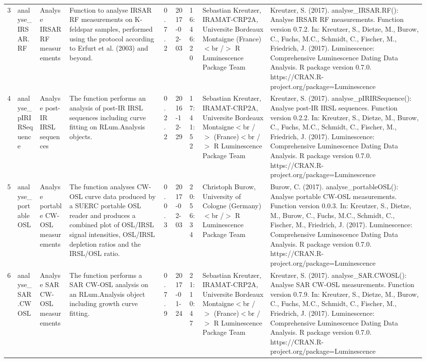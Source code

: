 \begin{table}[ht]
\begin{tabular}{rllllllll}
 \\ 
  3 & analyse\_IRSAR.RF & Analyse IRSAR RF measurements & Function to analyse IRSAR RF measurements on K-feldspar samples, performed using the protocol according to Erfurt et al. (2003) and beyond. & 0.7.2 & 2017-02-03 & 16:46:20
 & Sebastian Kreutzer, IRAMAT-CRP2A, Universite Bordeaux Montaigne (France)$<$br /$>$  R Luminescence Package Team & Kreutzer, S. (2017). analyse\_IRSAR.RF(): Analyse IRSAR RF measurements. Function version 0.7.2. In: Kreutzer, S., Dietze, M., Burow, C., Fuchs, M.C., Schmidt, C., Fischer, M., Friedrich, J. (2017). Luminescence: Comprehensive Luminescence Dating Data Analysis. R package version 0.7.0. https://CRAN.R-project.org/package=Luminescence
 \\ 
  4 & analyse\_pIRIRSequence & Analyse post-IR IRSL sequences & The function performs an analysis of post-IR IRSL sequences including curve fitting on  RLum.Analysis  objects. & 0.2.2 & 2016-12-29 & 17:41:52
 & Sebastian Kreutzer, IRAMAT-CRP2A, Universite Bordeaux Montaigne$<$br /$>$ (France)$<$br /$>$  R Luminescence Package Team & Kreutzer, S. (2017). analyse\_pIRIRSequence(): Analyse post-IR IRSL sequences. Function version 0.2.2. In: Kreutzer, S., Dietze, M., Burow, C., Fuchs, M.C., Schmidt, C., Fischer, M., Friedrich, J. (2017). Luminescence: Comprehensive Luminescence Dating Data Analysis. R package version 0.7.0. https://CRAN.R-project.org/package=Luminescence
 \\ 
  5 & analyse\_portableOSL & Analyse portable CW-OSL measurements & The function analyses CW-OSL curve data produced by a SUERC portable OSL reader and produces a combined plot of OSL/IRSL signal intensities, OSL/IRSL depletion ratios and the IRSL/OSL ratio. & 0.0.3 & 2017-02-03 & 20:56:34
 & Christoph Burow, University of Cologne (Germany)$<$br /$>$  R Luminescence Package Team & Burow, C. (2017). analyse\_portableOSL(): Analyse portable CW-OSL measurements. Function version 0.0.3. In: Kreutzer, S., Dietze, M., Burow, C., Fuchs, M.C., Schmidt, C., Fischer, M., Friedrich, J. (2017). Luminescence: Comprehensive Luminescence Dating Data Analysis. R package version 0.7.0. https://CRAN.R-project.org/package=Luminescence
 \\ 
  6 & analyse\_SAR.CWOSL & Analyse SAR CW-OSL measurements & The function performs a SAR CW-OSL analysis on an RLum.Analysis  object including growth curve fitting. & 0.7.9 & 2017-01-24 & 21:10:47
 & Sebastian Kreutzer, IRAMAT-CRP2A, Universite Bordeaux Montaigne$<$br /$>$ (France)$<$br /$>$  R Luminescence Package Team & Kreutzer, S. (2017). analyse\_SAR.CWOSL(): Analyse SAR CW-OSL measurements. Function version 0.7.9. In: Kreutzer, S., Dietze, M., Burow, C., Fuchs, M.C., Schmidt, C., Fischer, M., Friedrich, J. (2017). Luminescence: Comprehensive Luminescence Dating Data Analysis. R package version 0.7.0. https://CRAN.R-project.org/package=Luminescence

\end{tabular}
\end{table}

